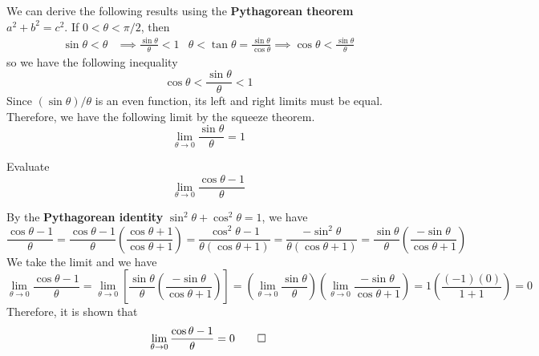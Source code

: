 We can derive the following results using the \textbf{Pythagorean theorem}
\(a^2+b^2=c^2\).
If \(0<\theta<\pi/2\), then
\begin{align*}
    \sin\theta<\theta&\implies\frac{\sin\theta}{\theta}<1
    &\theta<\tan\theta=\frac{\sin\theta}{\cos\theta}\implies\cos\theta
    <\frac{\sin\theta}{\theta}
\end{align*}
so we have the following inequality
\[\cos\theta<\frac{\sin\theta}{\theta}<1\]
Since \((\sin\theta)/\theta\) is an even function, its left and right limits
must be equal.
Therefore, we have the following limit by the squeeze theorem.
\[\lim_{\theta\to 0}\frac{\sin\theta}{\theta}=1\]
\begin{problem}
    Evaluate \[\lim_{\theta\to 0}\frac{\cos\theta-1}{\theta}\]
\end{problem}
\begin{solution}
    By the \textbf{Pythagorean identity} \(\sin^2\theta+\cos^2\theta=1\), we have
    \[\frac{\cos\theta-1}{\theta}
    =\frac{\cos\theta-1}{\theta}\left(\frac{\cos\theta+1}{\cos\theta+1}\right)
    =\frac{\cos^2\theta-1}{\theta(\cos\theta+1)}
    =\frac{-\sin^2\theta}{\theta(\cos\theta+1)}
    =\frac{\sin\theta}{\theta}\left(\frac{-\sin\theta}{\cos\theta+1}\right)\]
    We take the limit and we have
    \[\lim_{\theta\to 0}\frac{\cos\theta-1}{\theta}
    =\lim_{\theta\to 0}\left[\frac{\sin\theta}{\theta}
    \left(\frac{-\sin\theta}{\cos\theta+1}\right)\right]
    =\left(\lim_{\theta\to 0}\frac{\sin\theta}{\theta}\right)
    \left(\lim_{\theta\to 0}\frac{-\sin\theta}{\cos\theta+1}\right)
    =1\left(\frac{(-1)(0)}{1+1}\right)=0\]
    Therefore, it is shown that
    \[\lim_{\theta\to 0}\frac{\cos\theta-1}{\theta}=0\qedhere\]
\end{solution}